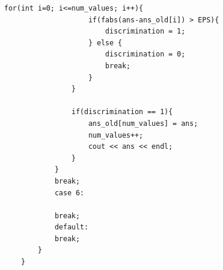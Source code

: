 \documentclass{jsarticle}
\begin{document}
\begin{lstlisting}[basicstyle=\ttfamily\footnotesize, frame=single]
                for(int i=0; i<=num_values; i++){
                    if(fabs(ans-ans_old[i]) > EPS){
                        discrimination = 1;
                    } else {
                        discrimination = 0;
                        break;
                    }
                }

                if(discrimination == 1){
                    ans_old[num_values] = ans;
                    num_values++;
                    cout << ans << endl;
                }
            }
            break;
            case 6:

            break;
            default:
            break;
        }
    }
    \end{lstlisting} 
    
\end{document}
